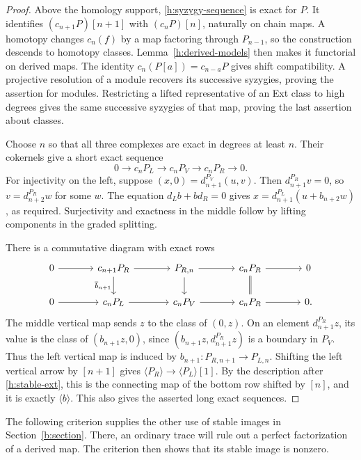 \begin{proof}
Above the homology support, \eqref{h:syzygy-sequence} is exact for $P$.
It identifies $(c_{n+1}P)[n+1]$ with $(c_nP)[n]$, naturally on chain maps.
A homotopy changes $c_n(f)$ by a map factoring through $P_{n-1}$, so the
construction descends to homotopy classes. Lemma~\ref{h:derived-models}
then makes it functorial on derived maps. The identity
$c_n(P[a])=c_{n-a}P$ gives shift compatibility. A projective resolution of
a module recovers its successive syzygies, proving the assertion for
modules. Restricting a lifted representative of an Ext class to high
degrees gives the same successive syzygies of that map, proving the last
assertion about classes.

Choose $n$ so that all three complexes are exact in degrees at least $n$.
Their cokernels give a short exact sequence
\[
 0\longrightarrow c_nP_L\longrightarrow c_nP_V
 \longrightarrow c_nP_R\longrightarrow0.
\]
For injectivity on the left, suppose
$(x,0)=d_{n+1}^{P_V}(u,v)$. Then $d_{n+1}^{P_R}v=0$, so
$v=d_{n+2}^{P_R}w$ for some $w$. The equation $d_Lb+bd_R=0$ gives
$x=d_{n+1}^{P_L}(u+b_{n+2}w)$, as required. Surjectivity and exactness in
the middle follow by lifting components in the graded splitting.

There is a commutative diagram with exact rows
\[
\begin{tikzcd}[column sep=large]
0\arrow[r]&c_{n+1}P_R\arrow[r]\arrow[d,"\overline b_{n+1}"']
 &P_{R,n}\arrow[r]\arrow[d]
 &c_nP_R\arrow[r]\arrow[d,equal]&0\\
0\arrow[r]&c_nP_L\arrow[r]&c_nP_V\arrow[r]&c_nP_R\arrow[r]&0.
\end{tikzcd}
\]
The middle vertical map sends $z$ to the class of $(0,z)$. On an element
$d_{n+1}^{P_R}z$, its value is the class of $(b_{n+1}z,0)$, since
$(b_{n+1}z,d_{n+1}^{P_R}z)$ is a boundary in $P_V$. Thus the left vertical
map is induced by $b_{n+1}:P_{R,n+1}\to P_{L,n}$.
Shifting the left vertical arrow by $[n+1]$ gives
$\langle P_R\rangle\to\langle P_L\rangle[1]$. By the description after
\eqref{h:stable-ext}, this is the connecting map of the bottom row shifted
by $[n]$, and it is exactly $\langle b\rangle$. This also gives the
asserted long exact sequences.
\end{proof}

The following criterion supplies the other use of stable images in
Section~\ref{b:section}. There, an ordinary trace will rule out a perfect
factorization of a derived map. The criterion then shows that its stable
image is nonzero.

